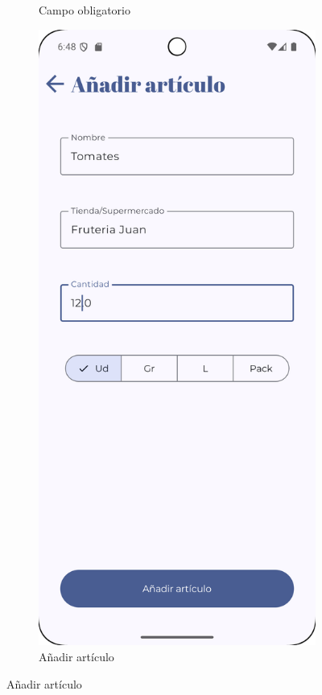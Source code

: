 \begin{figure}[H]
\begin{subfigure}[b]{0.3\textwidth}
      \caption{Campo obligatorio}
      \label{fig:item-details-must}
    \end{subfigure}
    \hfill
    \begin{subfigure}[b]{0.3\textwidth}
      \includegraphics[width=\textwidth]{./img/manual/add_item_content_shopping_list.png}
      \caption{Añadir artículo}
      \label{fig:add-item}
    \end{subfigure}

    \caption{Añadir artículo}
    \label{fig:create-item}
\end{figure}

